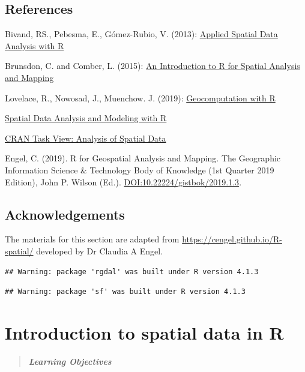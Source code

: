 \documentclass[
  11pt,
]{book}
\begin{document}
\hypertarget{references}{%
\section*{References}\label{references}}


Bivand, RS., Pebesma, E., Gómez-Rubio, V. (2013): \href{https://link.springer.com/book/10.1007\%2F978-1-4614-7618-4}{Applied Spatial Data Analysis with R}

Brunsdon, C. and Comber, L. (2015): \href{https://us.sagepub.com/en-us/nam/an-introduction-to-r-for-spatial-analysis-and-mapping/book241031}{An Introduction to R for Spatial Analysis and Mapping}

Lovelace, R., Nowosad, J., Muenchow. J. (2019): \href{https://geocompr.robinlovelace.net}{Geocomputation with R}

\href{http://www.rspatial.org/index.html}{Spatial Data Analysis and Modeling with R}

\href{https://CRAN.R-project.org/view=Spatial}{CRAN Task View: Analysis of Spatial Data}

Engel, C. (2019). R for Geospatial Analysis and Mapping. The Geographic Information Science \& Technology Body of Knowledge (1st Quarter 2019 Edition), John P. Wilson (Ed.). \href{https://doi.org/10.22224/gistbok/2019.1.3}{DOI:10.22224/gistbok/2019.1.3}.

\hypertarget{acknowledgements}{%
\section*{Acknowledgements}\label{acknowledgements}}


The materials for this section are adapted from \url{https://cengel.github.io/R-spatial/} developed by Dr Claudia A Engel.

\begin{verbatim}
## Warning: package 'rgdal' was built under R version 4.1.3
\end{verbatim}

\begin{verbatim}
## Warning: package 'sf' was built under R version 4.1.3
\end{verbatim}

\hypertarget{intro}{%
\chapter{Introduction to spatial data in R}\label{intro}}

\begin{quote}
\textbf{\emph{Learning Objectives}}
\end{quote}
\end{document}

